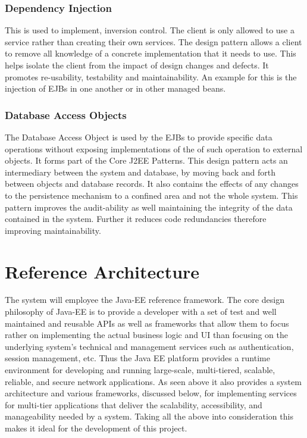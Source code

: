 \documentclass[12pt]{article}
\begin{document}
\subsubsection{Dependency Injection}
This is used to implement, inversion control. The client is only allowed to use a service rather than creating their own services. The design pattern allows a client to remove all knowledge of a concrete implementation that it needs to use. This helps isolate the client from the impact of design changes and defects. It promotes re-usability, testability and maintainability. An example for this is the injection of EJBs in one another or in other managed beans. 

\subsubsection{Database Access Objects}
The Database Access Object is used by the EJBs to provide specific data operations without exposing implementations of the of such operation to external objects. It forms part of the Core J2EE Patterns. This design pattern acts an intermediary between the system and database, by moving back and forth between objects and database records. It also contains the effects of any changes to the persistence mechanism to a confined area and not the whole system. This pattern improves the audit-ability as well maintaining the integrity of the data contained in the system. Further it reduces code redundancies therefore improving maintainability. 

\section{Reference Architecture}
The system will employee the Java-EE reference framework. The core design philosophy of Java-EE is to provide a developer with a set of test and well maintained and reusable APIs as well as frameworks that allow them to focus rather on implementing the actual business logic and UI than focusing on the underlying system's technical and management services such as authentication, session management, etc. Thus the Java EE platform provides a runtime environment for developing and running large-scale, multi-tiered, scalable, reliable, and secure network applications. As seen above it also provides a system architecture and various frameworks, discussed below, for implementing services for multi-tier applications that deliver the scalability, accessibility, and manageability needed by a system. Taking all the above into consideration this makes it ideal for the development of this project.
\end{document}
